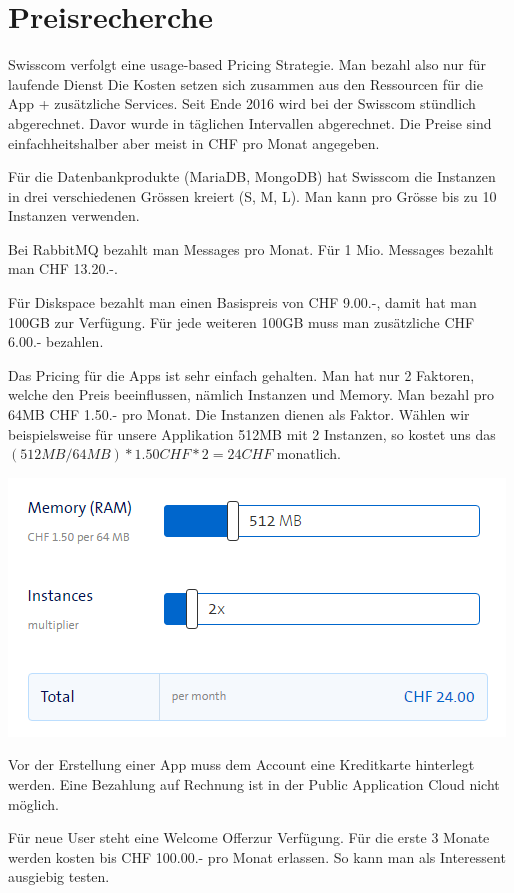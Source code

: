 \chapter{Preisrecherche}
Swisscom verfolgt eine usage-based Pricing Strategie. Man bezahl also nur für laufende Dienst Die Kosten setzen sich zusammen aus den Ressourcen für die App + zusätzliche Services. Seit Ende 2016 wird bei der Swisscom stündlich abgerechnet. Davor wurde in täglichen Intervallen abgerechnet. Die Preise sind einfachheitshalber aber meist in CHF pro Monat angegeben. 

Für die Datenbankprodukte (MariaDB, MongoDB) hat Swisscom die Instanzen in drei verschiedenen Grössen kreiert (S, M, L). Man kann pro Grösse bis zu 10 Instanzen verwenden. 

Bei RabbitMQ bezahlt man Messages pro Monat. Für 1 Mio. Messages bezahlt man CHF 13.20.-. 

Für Diskspace bezahlt man einen Basispreis von CHF 9.00.-, damit hat man 100GB zur Verfügung. Für jede weiteren 100GB muss man zusätzliche CHF 6.00.- bezahlen.

Das Pricing für die Apps ist sehr einfach gehalten. Man hat nur 2 Faktoren, welche den Preis beeinflussen, nämlich Instanzen und Memory. Man bezahl pro 64MB CHF 1.50.- pro Monat. Die Instanzen dienen als Faktor. Wählen wir beispielsweise für unsere Applikation 512MB mit 2 Instanzen, so kostet uns das \((512MB/64MB)*1.50CHF*2=24CHF\) monatlich.

\includegraphics[scale=0.8]{images/price-per-month.png}

Vor der Erstellung einer App muss dem Account eine Kreditkarte hinterlegt werden. Eine Bezahlung auf Rechnung ist in der Public Application Cloud nicht möglich.

Für neue User steht eine \glqq Welcome Offer\grqq zur Verfügung. Für die erste 3 Monate werden kosten bis CHF 100.00.- pro Monat erlassen. So kann man als Interessent ausgiebig testen. 

